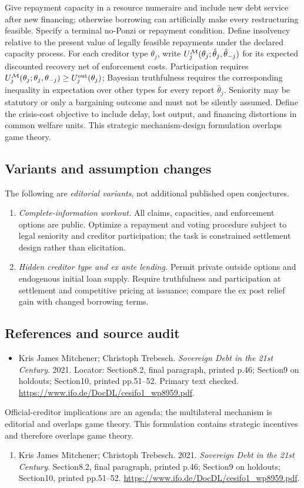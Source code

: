 \documentclass[11pt,a4paper]{article}
\begin{document}
Give repayment capacity in a resource numeraire and include new debt service after new financing; otherwise borrowing can artificially make every restructuring feasible. Specify a terminal no-Ponzi or repayment condition. Define insolvency relative to the present value of legally feasible repayments under the declared capacity process. For each creditor type \(\theta_j\), write \(U_j^{\cal M}(\theta_j;\hat\theta_j,\hat\theta_{-j})\) for its expected discounted recovery net of enforcement costs. Participation requires \(U_j^{\cal M}(\theta_j;\theta_j,\theta_{-j})\ge U_j^{\rm out}(\theta_j)\); Bayesian truthfulness requires the corresponding inequality in expectation over other types for every report \(\hat\theta_j\). Seniority may be statutory or only a bargaining outcome and must not be silently assumed. Define the crisis-cost objective to include delay, lost output, and financing distortions in common welfare units. This strategic mechanism-design formulation overlaps game theory.
\subsection*{Variants and assumption changes}
The following are \emph{editorial variants}, not additional published open conjectures.
\begin{enumerate}
\item \emph{Complete-information workout.} All claims, capacities, and enforcement options are public. Optimize a repayment and voting procedure subject to legal seniority and creditor participation; the task is constrained settlement design rather than elicitation.
\item \emph{Hidden creditor type and ex ante lending.} Permit private outside options and endogenous initial loan supply. Require truthfulness and participation at settlement and competitive pricing at issuance; compare the ex post relief gain with changed borrowing terms.
\end{enumerate}
\subsection*{References and source audit}
\begin{itemize}
\item Kris James Mitchener; Christoph Trebesch. \emph{Sovereign Debt in the 21st Century}. 2021. Locator: Section8.2, final paragraph, printed p.46; Section9 on holdouts; Section10, printed pp.51--52. Primary text checked. \url{https://www.ifo.de/DocDL/cesifo1_wp8959.pdf}.
\end{itemize}
Official-creditor implications are an agenda; the multilateral mechanism is editorial and overlaps game theory. This formulation contains strategic incentives and therefore overlaps game theory.
\begin{enumerate}\raggedright
\item\hypertarget{definitions:source:30007537:1}{} Kris James Mitchener; Christoph Trebesch. 2021. \emph{Sovereign Debt in the 21st Century}. Section8.2, final paragraph, printed p.46; Section9 on holdouts; Section10, printed pp.51--52.
\url{https://www.ifo.de/DocDL/cesifo1_wp8959.pdf}.
\end{enumerate}
\end{document}

